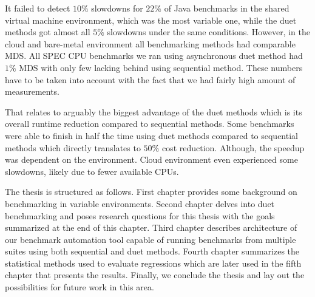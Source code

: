 It failed to detect $10\%$ slowdowns for $22\%$ of Java benchmarks in the shared virtual machine environment, which was the most variable one, while the duet methods got almost all $5\%$ slowdowns under the same conditions.
However, in the cloud and \mbox{bare-metal} environment all benchmarking methods had comparable MDS.
All SPEC CPU benchmarks we ran using asynchronous duet method had $1\%$ MDS with only few lacking behind using sequential method.
These numbers have to be taken into account with the fact that we had fairly high amount of measurements.

That relates to arguably the biggest advantage of the duet methods which is its overall runtime reduction compared to sequential methods.
Some benchmarks were able to finish in half the time using duet methods compared to sequential methods which directly translates to $50\%$ cost reduction.
Although, the speedup was dependent on the environment.
Cloud environment even experienced some slowdowns, likely due to fewer available CPUs.

The thesis is structured as follows.
First chapter provides some background on benchmarking in variable environments.
Second chapter delves into duet benchmarking and poses research questions for this thesis with the goals summarized at the end of this chapter.
Third chapter describes architecture of our benchmark automation tool capable of running benchmarks from multiple suites using both sequential and duet methods.
Fourth chapter summarizes the statistical methods used to evaluate regressions which are later used in the fifth chapter that presents the results.
Finally, we conclude the thesis and lay out the possibilities for future work in this area.
